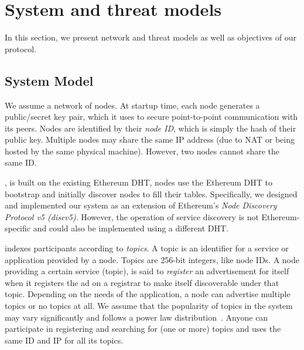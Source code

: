 
\section{System and threat models}
\label{sec:model}

In this section, we present \sysname network and threat models as well as objectives of our protocol. 

\subsection{System Model}
We assume a network of nodes. At startup time, each node generates a public/secret key pair, which it uses to secure point-to-point communication with its peers. Nodes are identified by their \emph{node ID}, which is simply the hash of their public key. Multiple nodes may share the same IP address (due to NAT or being hosted by the same physical machine). However, two nodes cannot share the same ID.

\sysname, is built on the existing Ethereum DHT, \ie nodes use the Ethereum DHT to bootstrap and initially discover nodes to fill their tables. Specifically, we designed and implemented our system as an extension of Ethereum's \emph{Node Discovery Protocol v5 (discv5)}. However, the operation of service discovery is not Ethereum-specific and could also be implemented using a different DHT.

\sysname indexes participants according to \emph{topics}. A topic is an identifier for a
service or application provided by a node. Topics are 256-bit integers, like node IDs.
A node providing a certain service (topic), is said to \emph{register} an advertisement for itself when it registers the ad on a registrar to make itself discoverable under that topic. Depending on the needs of the application, a node can advertise multiple topics or no topics at all. We assume that the popularity of topics in the system may vary significantly and follows a power law distribution~\cite{kim2018measuring}. Anyone can participate in registering and searching for (one or more) topics and uses the same ID and IP for all its topics. 

